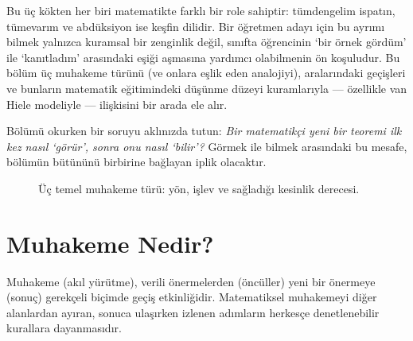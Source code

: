 Bu üç kökten her biri matematikte farklı bir role sahiptir: tümdengelim ispatın, tümevarım ve abdüksiyon ise keşfin dilidir. Bir öğretmen adayı için bu ayrımı bilmek yalnızca kuramsal bir zenginlik değil, sınıfta öğrencinin ‘bir örnek gördüm’ ile ‘kanıtladım’ arasındaki eşiği aşmasına yardımcı olabilmenin ön koşuludur. Bu bölüm üç muhakeme türünü (ve onlara eşlik eden analojiyi), aralarındaki geçişleri ve bunların matematik eğitimindeki düşünme düzeyi kuramlarıyla — özellikle van Hiele modeliyle — ilişkisini bir arada ele alır.

Bölümü okurken bir soruyu aklınızda tutun: \emph{Bir matematikçi yeni bir teoremi ilk kez nasıl ‘görür’, sonra onu nasıl ‘bilir’?} Görmek ile bilmek arasındaki bu mesafe, bölümün bütününü birbirine bağlayan iplik olacaktır.

\begin{figure}[h]
\centering
{}
\caption{Üç temel muhakeme türü: yön, işlev ve sağladığı kesinlik derecesi.}
\end{figure}

\section{Muhakeme Nedir?}

Muhakeme (akıl yürütme), verili önermelerden (öncüller) yeni bir önermeye (sonuç) gerekçeli biçimde geçiş etkinliğidir. Matematiksel muhakemeyi diğer alanlardan ayıran, sonuca ulaşırken izlenen adımların herkesçe denetlenebilir kurallara dayanmasıdır.

